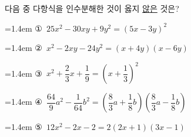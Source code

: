 다음 중 다항식을 인수분해한 것이 옳지 \underline{않은} 것은?
\par\medskip\par\noindent\hangindent=1.4em {\small ①}\ $25x^2-30xy+9y^2=(5x-3y)^2$\par\noindent\hangindent=1.4em {\small ②}\ $x^2-2xy-24y^2=(x+4y)(x-6y)$\par\noindent\hangindent=1.4em {\small ③}\ $x^2+\dfrac{2}{3}x+\dfrac{1}{9}=\left(x+\dfrac{1}{3}\right)^2$\par\noindent\hangindent=1.4em {\small ④}\ $\dfrac{64}{9}a^2-\dfrac{1}{64}b^2=\left(\dfrac{8}{3}a+\dfrac{1}{8}b\right)\left(\dfrac{8}{3}a-\dfrac{1}{8}b\right)$\par\noindent\hangindent=1.4em {\small ⑤}\ $12x^2-2x-2=2(2x+1)(3x-1)$\par\medskip
